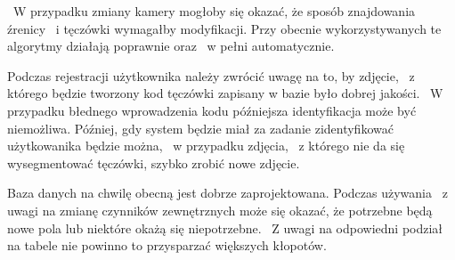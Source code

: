 ~W przypadku zmiany kamery mogłoby się okazać, że sposób znajdowania źrenicy ~i tęczówki wymagałby modyfikacji. Przy obecnie wykorzystywanych te algorytmy działają poprawnie oraz ~w pełni automatycznie.

Podczas rejestracji użytkownika należy zwrócić uwagę na to, by zdjęcie, ~z którego będzie tworzony kod tęczówki zapisany w bazie było dobrej jakości. ~W przypadku błednego wprowadzenia kodu późniejsza identyfikacja może być niemożliwa. Później, gdy system będzie miał za zadanie zidentyfikować użytkowanika będzie można, ~w przypadku zdjęcia, ~z którego nie da się wysegmentować tęczówki, szybko zrobić nowe zdjęcie.

Baza danych na chwilę obecną jest dobrze zaprojektowana. Podczas używania ~z uwagi na zmianę czynników zewnętrznych może się okazać, że potrzebne będą nowe pola lub niektóre okażą się niepotrzebne. ~Z uwagi na odpowiedni podział na tabele nie powinno to przysparzać większych kłopotów.

